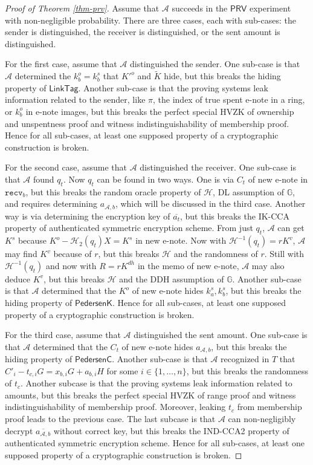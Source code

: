 \documentclass{article}
\begin{document}
\begin{proof}[Proof of Theorem \ref{thm-prv}]
Assume that $\mathcal{A}$ succeeds in the $\textsf{PRV}$ experiment with non-negligible probability. There are three cases, each with sub-cases: the sender is distinguished, the receiver is distinguished, or the sent amount is distinguished.

For the first case, assume that $\mathcal{A}$ distinguished the sender. One sub-case is that $\mathcal{A}$ determined the $k_b^o = k_b^s$ that $K'^o$ and $\tilde{K}$ hide, but this breaks the hiding property of $\textsf{LinkTag}$. Another sub-case is that the proving systems leak information related to the sender, like $\pi$, the index of true spent e-note in a ring, or $k_b^o$ in e-note images, but this breaks the perfect special HVZK of ownership and unspentness proof and witness indistinguishability of membership proof. Hence for all sub-cases, at least one supposed property of a cryptographic construction is broken.

For the second case, assume that $\mathcal{A}$ distinguished the receiver. One sub-case is that $\mathcal{A}$ found $q_t$. Now $q_t$ can be found in two ways. One is via $C_t$ of new e-note in $\texttt{recv}_b$, but this breaks the random oracle property of  $\mathcal{H}$, DL assumption of $\mathbb{G}$, and requires determining $a_{\mathcal{A},b}$, which will be discussed in the third case. Another way is via determining the encryption key of $\overline{a_t}$, but this breaks the IK-CCA property of authenticated symmetric encryption scheme. From just $q_t$, $\mathcal{A}$ can get $K^s$ because $K^o - \mathcal{H}_2(q_t)X = K^s$ in new e-note. Now with $\mathcal{H}^{-1}(q_t) = r K^{v}$, $\mathcal{A}$ may find $K^v$ because of $r$, but this breaks $\mathcal{H}$ and the randomness of $r$. Still with $\mathcal{H}^{-1}(q_t)$ and now with $R = r K^{dh}$ in the memo of new e-note, $\mathcal{A}$ may also deduce $K^v$, but this breaks $\mathcal{H}$ and the DDH assumption of $\mathbb{G}$. Another sub-case is that $\mathcal{A}$ determined that the $K^o$ of new e-note hides $k_a^s, k_b^s$, but this breaks the hiding property of $\textsf{PedersenK}$. Hence for all sub-cases, at least one supposed property of a cryptographic construction is broken.

For the third case, assume that $\mathcal{A}$ distinguished the sent amount. One sub-case is that $\mathcal{A}$ determined that the $C_t$ of new e-note hides $a_{\mathcal{A}, b}$, but this breaks the hiding property of $\textsf{PedersenC}$. Another sub-case is that $\mathcal{A}$ recognized in $T$ that $C'_i - t_{c, i}G = x_{b,i}G + a_{b,i}H$ for some $i \in \{1, \ldots, n\}$, but this breaks the randomness of $t_c$. Another subcase is that the proving systems leak information related to amounts, but this breaks the perfect special HVZK of range proof and witness indistinguishability of membership proof. Moreover, leaking $t_c$ from membership proof leads to the previous case. The last subcase is that $\mathcal{A}$ can non-negligibly decrypt $\overline{a_{\mathcal{A},b}}$ without correct key, but this breaks the IND-CCA2 property of authenticated symmetric encryption scheme. Hence for all sub-cases, at least one supposed property of a cryptographic construction is broken.
\end{proof}
\end{document}
